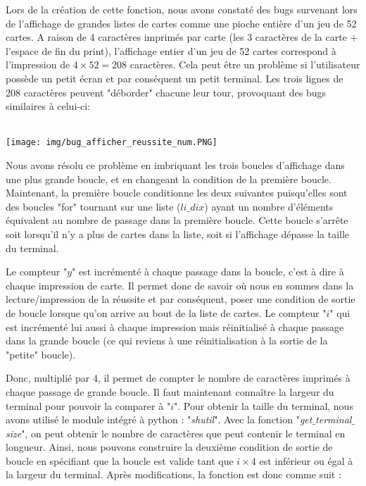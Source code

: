 \documentclass[10pt,a4paper,french,titlepage]{article}
\theoremstyle{definition}
\begin{document}
Lors de la création de cette fonction, nous avons constaté des bugs survenant lors de l'affichage de grandes listes de cartes comme une pioche entière d'un jeu de 52 cartes. A raison de 4 caractères imprimés par carte (les 3 caractères de la carte $+$ l'espace de fin du print), l'affichage entier d'un jeu de 52 cartes correspond à l'impression de $4\times52=208$ caractères. Cela peut être un problème si l'utilisateur possède un petit écran et par conséquent un petit terminal. Les trois lignes de 208 caractères peuvent "déborder" chacune leur tour, provoquant des bugs similaires à celui-ci: \\\\
\begin{center}
\texttt{[image: img/bug\_afficher\_reussite\_num.PNG]}
\end{center}

Nous avons résolu ce problème en imbriquant les trois boucles d'affichage dans une plus grande boucle, et en changeant la condition de la première boucle. Maintenant, la première boucle conditionne les deux suivantes puisqu'elles sont des boucles "for" tournant sur une liste ($li\_dix$) ayant un nombre d'éléments équivalent au nombre de passage dans la première boucle. Cette boucle s'arrête soit lorsqu'il n'y a plus de cartes dans la liste, soit si l'affichage dépasse la taille du terminal. 

Le compteur "$y$" est incrémenté à chaque passage dans la boucle, c'est à dire à chaque impression de carte. Il permet donc de savoir où nous en sommes dans la lecture/impression de la réussite et par conséquent, poser une condition de sortie de boucle lorsque qu'on arrive au bout de la liste de cartes. Le compteur "$i$" qui est incrémenté lui aussi à chaque impression mais réinitialisé à chaque passage dans la grande boucle (ce qui reviens à une réinitialisation à la sortie de la "petite" boucle). 

Donc, multiplié par 4, il permet de compter le nombre de caractères imprimés à chaque passage de grande boucle. Il faut maintenant connaître la largeur du terminal pour pouvoir la comparer à "$i$". Pour obtenir la taille du terminal, nous avons utilisé le module intégré à python : "\textit{shutil}". Avec la fonction "\textit{get$\_$terminal$\_$size}", on peut obtenir le nombre de caractères que peut contenir le terminal en longueur. Ainsi, nous pouvons construire la deuxième condition de sortie de boucle en spécifiant que la boucle est valide tant que $i \times 4$ est inférieur ou égal à la largeur du terminal. Après modifications, la fonction est donc comme suit :
\end{document}
